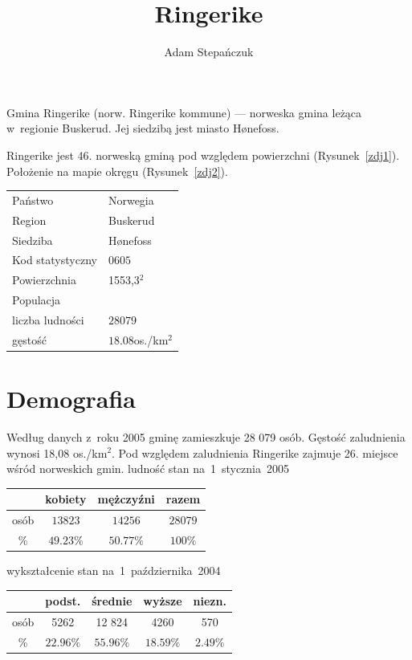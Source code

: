\documentclass[a4paper,12pt]{article}
\title{Ringerike}
\author{Adam Stepańczuk}
\begin{document}
\maketitle


Gmina Ringerike (norw. Ringerike kommune) --- norweska gmina leżąca w~regionie Buskerud. Jej siedzibą jest miasto Hønefoss.

Ringerike jest 46. norweską gminą pod względem powierzchni (Rysunek~\ref{zdj1}). 
Położenie na mapie okręgu (Rysunek~\ref{zdj2}).

\begin{table}[here]
\centering
\begin{tabular}{l|l}
Państwo & Norwegia \\
Region & Buskerud \\
Siedziba &  	Hønefoss \\
Kod statystyczny & $0605$ \\
Powierzchnia & 1553,3$^2$ \\
Populacja & \\
liczba ludności & $28 079$ \\
gęstość & $18.08$os./km$^2$ \\

\end{tabular}
\end{table}



\section{Demografia}

Według danych z~roku 2005 gminę zamieszkuje 28 079 osób. Gęstość zaludnienia wynosi 18,08 os./km$^2$. Pod względem zaludnienia Ringerike zajmuje 26. miejsce wśród norweskich gmin.
\newline \newline
ludność
stan na~1~stycznia~2005
\begin{table}[here]
\centering
\begin{tabular}{c|ccc}
 & kobiety & mężczyźni & razem \\
\hline
osób & $13 823$ & $14 256$ & $28 079$ \\
\% & $49.23\%$ & $50.77\%$ & $100\%$ \\
\end{tabular}
\end{table}

wykształcenie
stan na~1~października~2004
\begin{table}[here]
\centering
\begin{tabular}{c|cccc}
 & podst. & średnie & wyższe & niezn. \\
\hline
osób & 5262 & 12 824 & 4260 & 570 \\
\% & $22.96\%$ & $55.96\%$ & $18.59\%$ &  $2.49\%$ \\
\end{tabular}
\end{table}
\end{document}
